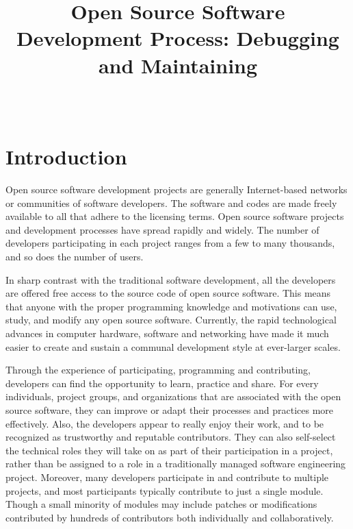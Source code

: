 \documentclass[draftclsnofoot,journal,onecolumn,12pt]{IEEEtran}
\begin{document}
\title{Open Source Software Development Process: Debugging and Maintaining}

\author{ \\
}

\maketitle
%

\section{Introduction}

Open source software development projects are generally Internet-based networks or communities of software developers. The software and codes are made freely available to all that adhere to the licensing terms. Open source software projects and development processes have spread rapidly and widely. The number of developers participating in each project ranges from a few to many thousands, and so does the number of users.

In sharp contrast with the traditional software development, all the developers are offered free access to the source code of open source software. This means that anyone with the proper programming knowledge and motivations can use, study, and modify any open source software. Currently, the rapid technological advances in computer hardware, software and networking have made it much easier to create and sustain a communal development style at ever-larger scales.

Through the experience of participating, programming and contributing, developers can find the opportunity to learn, practice and share. For every individuals, project groups, and organizations that are associated with the open source software, they can improve or adapt their processes and practices more effectively. Also, the developers appear to really enjoy their work, and to be recognized as trustworthy and reputable contributors. They can also self-select the technical roles they will take on as part of their participation in a project, rather than be assigned to a role in a traditionally managed software engineering project. Moreover, many developers participate in and contribute to multiple projects, and most participants typically contribute to just a single module. Though a small minority of modules may include patches or modifications contributed by hundreds of contributors both individually and collaboratively.
\end{document}
